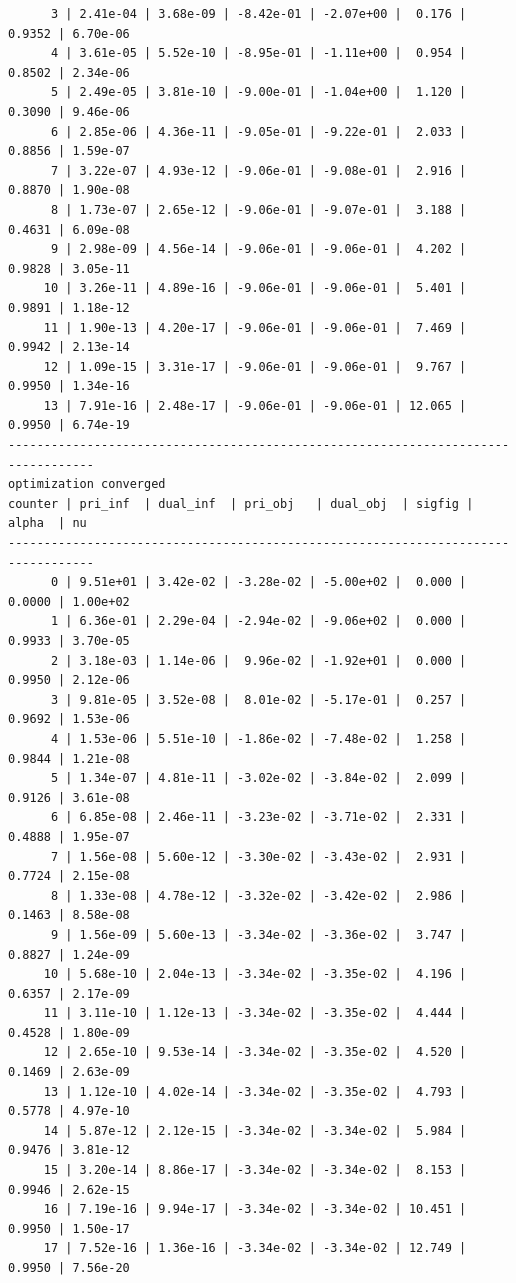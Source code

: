 \documentclass[
]{book}
\begin{document}
\begin{verbatim}
      3 | 2.41e-04 | 3.68e-09 | -8.42e-01 | -2.07e+00 |  0.176 | 0.9352 | 6.70e-06
      4 | 3.61e-05 | 5.52e-10 | -8.95e-01 | -1.11e+00 |  0.954 | 0.8502 | 2.34e-06
      5 | 2.49e-05 | 3.81e-10 | -9.00e-01 | -1.04e+00 |  1.120 | 0.3090 | 9.46e-06
      6 | 2.85e-06 | 4.36e-11 | -9.05e-01 | -9.22e-01 |  2.033 | 0.8856 | 1.59e-07
      7 | 3.22e-07 | 4.93e-12 | -9.06e-01 | -9.08e-01 |  2.916 | 0.8870 | 1.90e-08
      8 | 1.73e-07 | 2.65e-12 | -9.06e-01 | -9.07e-01 |  3.188 | 0.4631 | 6.09e-08
      9 | 2.98e-09 | 4.56e-14 | -9.06e-01 | -9.06e-01 |  4.202 | 0.9828 | 3.05e-11
     10 | 3.26e-11 | 4.89e-16 | -9.06e-01 | -9.06e-01 |  5.401 | 0.9891 | 1.18e-12
     11 | 1.90e-13 | 4.20e-17 | -9.06e-01 | -9.06e-01 |  7.469 | 0.9942 | 2.13e-14
     12 | 1.09e-15 | 3.31e-17 | -9.06e-01 | -9.06e-01 |  9.767 | 0.9950 | 1.34e-16
     13 | 7.91e-16 | 2.48e-17 | -9.06e-01 | -9.06e-01 | 12.065 | 0.9950 | 6.74e-19
----------------------------------------------------------------------------------
optimization converged
counter | pri_inf  | dual_inf  | pri_obj   | dual_obj  | sigfig | alpha  | nu 
----------------------------------------------------------------------------------
      0 | 9.51e+01 | 3.42e-02 | -3.28e-02 | -5.00e+02 |  0.000 | 0.0000 | 1.00e+02
      1 | 6.36e-01 | 2.29e-04 | -2.94e-02 | -9.06e+02 |  0.000 | 0.9933 | 3.70e-05
      2 | 3.18e-03 | 1.14e-06 |  9.96e-02 | -1.92e+01 |  0.000 | 0.9950 | 2.12e-06
      3 | 9.81e-05 | 3.52e-08 |  8.01e-02 | -5.17e-01 |  0.257 | 0.9692 | 1.53e-06
      4 | 1.53e-06 | 5.51e-10 | -1.86e-02 | -7.48e-02 |  1.258 | 0.9844 | 1.21e-08
      5 | 1.34e-07 | 4.81e-11 | -3.02e-02 | -3.84e-02 |  2.099 | 0.9126 | 3.61e-08
      6 | 6.85e-08 | 2.46e-11 | -3.23e-02 | -3.71e-02 |  2.331 | 0.4888 | 1.95e-07
      7 | 1.56e-08 | 5.60e-12 | -3.30e-02 | -3.43e-02 |  2.931 | 0.7724 | 2.15e-08
      8 | 1.33e-08 | 4.78e-12 | -3.32e-02 | -3.42e-02 |  2.986 | 0.1463 | 8.58e-08
      9 | 1.56e-09 | 5.60e-13 | -3.34e-02 | -3.36e-02 |  3.747 | 0.8827 | 1.24e-09
     10 | 5.68e-10 | 2.04e-13 | -3.34e-02 | -3.35e-02 |  4.196 | 0.6357 | 2.17e-09
     11 | 3.11e-10 | 1.12e-13 | -3.34e-02 | -3.35e-02 |  4.444 | 0.4528 | 1.80e-09
     12 | 2.65e-10 | 9.53e-14 | -3.34e-02 | -3.35e-02 |  4.520 | 0.1469 | 2.63e-09
     13 | 1.12e-10 | 4.02e-14 | -3.34e-02 | -3.35e-02 |  4.793 | 0.5778 | 4.97e-10
     14 | 5.87e-12 | 2.12e-15 | -3.34e-02 | -3.34e-02 |  5.984 | 0.9476 | 3.81e-12
     15 | 3.20e-14 | 8.86e-17 | -3.34e-02 | -3.34e-02 |  8.153 | 0.9946 | 2.62e-15
     16 | 7.19e-16 | 9.94e-17 | -3.34e-02 | -3.34e-02 | 10.451 | 0.9950 | 1.50e-17
     17 | 7.52e-16 | 1.36e-16 | -3.34e-02 | -3.34e-02 | 12.749 | 0.9950 | 7.56e-20

\end{verbatim}
\end{document}
